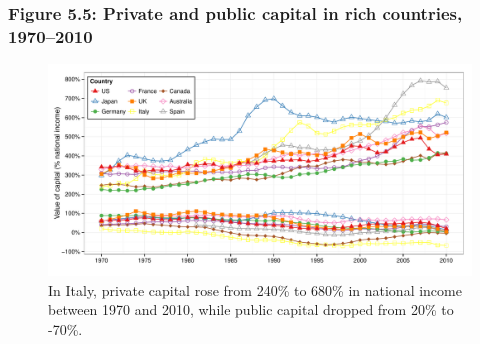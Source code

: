 \documentclass[t]{beamer}\usepackage[]{graphicx}\usepackage[]{color}
\newenvironment{knitrout}{}{} %
\begin{document}
\begin{frame}[label=Figure_5_5]
\frametitle{Figure 5.5: Private and public capital in rich countries, 1970--2010}
\begin{figure}[t]
\begin{minipage}[b]{\textwidth}
\centering
\begin{knitrout}\footnotesize
{}\color{fgcolor}

{\centering \includegraphics[width=1\linewidth,height=0.75\textheight]{figures/color/Figure_5_5} 

}



\end{knitrout}
\caption{In Italy, private capital rose from 240\% to 680\% in national income between 1970 and 2010, while public capital dropped from 20\% to -70\%.}
\end{minipage}
\end{figure}
\end{frame}
\end{document}
